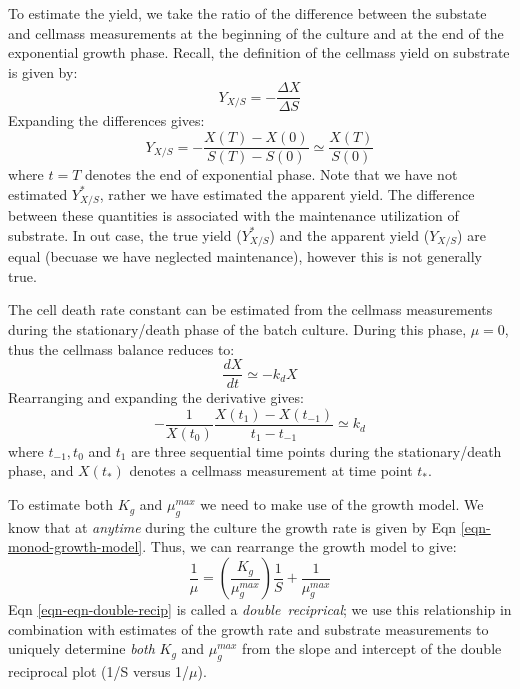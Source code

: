 \documentclass[11pt]{article}
\theoremstyle{definition}
\begin{document}
To estimate the yield, we take the ratio of the difference between the substate and cellmass measurements at the beginning of the culture
and at the end of the exponential growth phase. Recall, the definition of the cellmass yield on substrate is given by:
\begin{equation}
	Y_{X/S} = - \frac{\Delta X}{\Delta S}
\end{equation}Expanding the differences gives:
\begin{equation}
	Y_{X/S} = -\frac{X(T) - X(0)}{S(T) - S(0)}\simeq \frac{X(T)}{S(0)}
\end{equation}where $t=T$ denotes the end of exponential phase. Note that we have not estimated $Y_{X/S}^{*}$, rather we have estimated the apparent yield. The difference between these quantities is associated with the maintenance
utilization of substrate. In out case, the true yield ($Y_{X/S}^{*}$) and the apparent yield ($Y_{X/S}$) are equal (becuase we have neglected maintenance), however this is not generally true.

The cell death rate constant can be estimated from the cellmass measurements during the stationary/death phase of the batch culture.
During this phase, $\mu = 0$, thus the cellmass balance reduces to:
\begin{equation}
	\frac{dX}{dt} \simeq -k_{d}X
\end{equation}Rearranging and expanding the derivative gives:
\begin{equation}
	-\frac{1}{X(t_{0})}\frac{X(t_1) - X(t_{-1})}{t_{1} - t_{-1}}\simeq k_{d}
\end{equation}where $t_{-1},t_{0}$ and $t_{1}$ are three sequential time points during the stationary/death phase, and $X(t_{*})$ denotes a cellmass measurement at time point $t_{*}$.

To estimate both $K_{g}$ and $\mu_{g}^{max}$ we need to make use of the growth model. We know that at \textit{anytime} during the culture the growth rate is given by Eqn \eqref{eqn-monod-growth-model}.
Thus, we can rearrange the growth model to give:
\begin{equation}\label{eqn-eqn-double-recip}
	\frac{1}{\mu} = \left(\frac{K_{g}}{\mu_{g}^{max}}\right)\frac{1}{S}+\frac{1}{\mu_{g}^{max}}
\end{equation}Eqn \eqref{eqn-eqn-double-recip} is called a \textit{double~reciprical};
we use this relationship in combination with estimates of the growth rate and substrate measurements to uniquely determine \textit{both} $K_{g}$ and $\mu_{g}^{max}$
from the slope and intercept of the double reciprocal plot (1/S versus 1/$\mu$).
\end{document}
